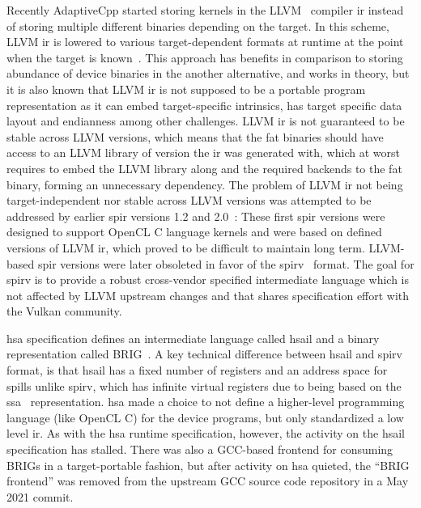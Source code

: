 \documentclass[Afour,sageh,times]{sagej}
\newcommand{\mycite}[1]{\citep{#1}}
\begin{document}
Recently AdaptiveCpp started storing kernels in the LLVM~\mycite{LLVM} compiler \gls{ir} instead of storing multiple different binaries depending on the target. In this scheme, LLVM \gls{ir} is lowered to various target-dependent formats at runtime at the point when the target is known~\mycite{OpenSYCLfatbin}.
This approach has benefits in comparison to storing abundance of device binaries in the another alternative, and works in theory, but it is also known that LLVM \gls{ir} is not supposed to be a portable program representation as it can embed target-specific intrinsics, has target specific data layout and endianness among other challenges.
LLVM \gls{ir} is not guaranteed to be stable across LLVM versions, which means that the fat binaries should have access to an LLVM library of version the \gls{ir} was generated with, which at worst requires to embed the LLVM library along and the required backends to the fat binary, forming an unnecessary dependency.
The problem of LLVM \gls{ir} not being target-independent nor stable across LLVM versions was attempted to be addressed by earlier \gls{spir} versions 1.2 and 2.0~\mycite{SPIR2}: These first \gls{spir} versions were designed to support OpenCL C language kernels and were based on defined versions of LLVM \gls{ir}, which proved to be difficult to maintain long term.
LLVM-based \gls{spir} versions were later obsoleted in favor of the \gls{spirv}~\mycite{SPIRV} format.
The goal for \gls{spirv} is to provide a robust cross-vendor specified intermediate language which is not affected by LLVM upstream changes and that shares specification effort with the Vulkan community.

\gls{hsa} specification defines an intermediate language called \gls{hsail} and a binary representation called BRIG~\mycite{HSAIL}. A key technical difference between \gls{hsail} and \gls{spirv} format, is that \gls{hsail} has 
a fixed number of registers and an address space for spills unlike \gls{spirv}, which has infinite virtual registers due to being based on the \gls{ssa}~\mycite{SSA} representation.
\gls{hsa} made a choice to not define a higher-level programming language (like OpenCL C) for the device programs, but only standardized a low level \gls{ir}.
As with the \gls{hsa} runtime specification, however, the activity on the \gls{hsail} specification has stalled.
There was also a GCC-based frontend for consuming BRIGs in a target-portable fashion, but after activity on \gls{hsa} quieted, the ``BRIG frontend'' was removed from the upstream GCC source code repository in a May 2021 commit.
\end{document}
